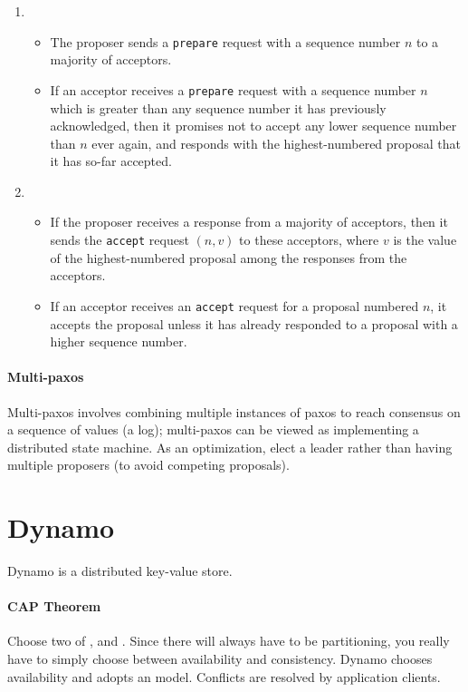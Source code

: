 \documentclass{article}
\begin{document}
\begin{enumerate}
\item {}
  \begin{itemize}
  \item The proposer sends a \texttt{prepare} request with a
    sequence number $n$ to a majority of acceptors.
  \item If an acceptor receives a \texttt{prepare} request with a
    sequence number $n$ which is greater than any sequence number it
    has previously acknowledged, then it promises not to accept any
    lower sequence number than $n$ ever again, and responds with the
    highest-numbered proposal that it has so-far accepted.
  \end{itemize}
\item {}
  \begin{itemize}
  \item If the proposer receives a response from a majority of
    acceptors, then it sends the \texttt{accept} request $(n,v)$ to
    these acceptors, where $v$ is the value of the highest-numbered
    proposal among the responses from the acceptors.
  \item If an acceptor receives an \texttt{accept} request for a
    proposal numbered $n$, it accepts the proposal unless it has
    already responded to a proposal with a higher sequence number.
  \end{itemize}
\end{enumerate}

\paragraph{Multi-paxos} Multi-paxos involves combining multiple
instances of paxos to reach consensus on a sequence of values (a log);
multi-paxos can be viewed as implementing a distributed state
machine. As an optimization, elect a leader rather than having
multiple proposers (to avoid competing proposals).

\section{Dynamo}

Dynamo is a distributed key-value store.

\paragraph{CAP Theorem} Choose two of ,
 and . Since there will always
have to be partitioning, you really have to simply choose between
availability and consistency. Dynamo chooses availability and adopts
an  model. Conflicts are resolved by
application clients.
\end{document}
